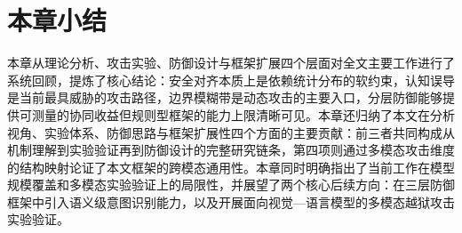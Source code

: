 \section{本章小结}

本章从理论分析、攻击实验、防御设计与框架扩展四个层面对全文主要工作进行了系统回顾，提炼了核心结论：安全对齐本质上是依赖统计分布的软约束，认知误导是当前最具威胁的攻击路径，边界模糊带是动态攻击的主要入口，分层防御能够提供可测量的协同收益但规则型框架的能力上限清晰可见。本章还归纳了本文在分析视角、实验体系、防御思路与框架扩展性四个方面的主要贡献：前三者共同构成从机制理解到实验验证再到防御设计的完整研究链条，第四项则通过多模态攻击维度的结构映射论证了本文框架的跨模态通用性。本章同时明确指出了当前工作在模型规模覆盖和多模态实验验证上的局限性，并展望了两个核心后续方向：在三层防御框架中引入语义级意图识别能力，以及开展面向视觉—语言模型的多模态越狱攻击实验验证。
